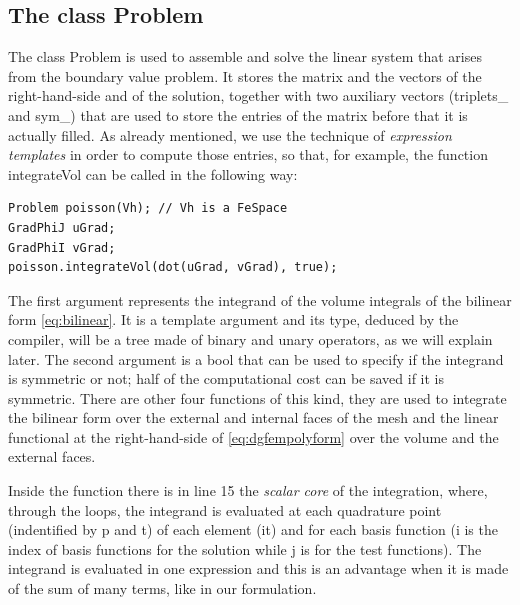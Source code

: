 \documentclass[12pt, a4paper]{article}
\newcommand{\code}[1]{{\footnotesize\ttfamily #1}}
\theoremstyle{definition}
\theoremstyle{plain}
\theoremstyle{plain}
\theoremstyle{definition}
\begin{document}
\subsection{The class Problem}

The class \code{Problem} is used to assemble and solve the linear system that arises from the boundary value problem.
It stores the matrix and the vectors of the right-hand-side and of the 
solution, together with two auxiliary vectors (\code{triplets\_} and 
\code{sym\_}) that are used to store the entries of the matrix before that it 
is actually filled.
As already mentioned, we use the technique of \emph{expression templates} in order to compute those entries, so that, for example, the function \code{integrateVol} can be called in the following way:
\begin{lstlisting}
Problem poisson(Vh); // Vh is a FeSpace
GradPhiJ uGrad;
GradPhiI vGrad;
poisson.integrateVol(dot(uGrad, vGrad), true);
\end{lstlisting}
The first argument represents the integrand of the volume integrals of the 
bilinear form \eqref{eq:bilinear}. It is a template argument and its type, 
deduced by the compiler, will be a tree made of binary and unary operators, as 
we will explain later.
The second argument is a \code{bool} that can be used to specify if the integrand is symmetric or not; half of the computational cost can be saved if it is symmetric. There are other four functions of this kind, they are used to integrate the bilinear form over the external and internal faces of the mesh and the linear functional at the right-hand-side of \eqref{eq:dgfempolyform} over the volume and the external faces.

Inside the function there is in line 15 the \emph{scalar core} of the integration, where, through the loops, the integrand is evaluated at each quadrature point (indentified by \code{p} and \code{t}) of each element (\code{*it}) and for each basis function (\code{i} is the index of basis functions for the solution while \code{j} is for the test functions). The integrand is evaluated in one expression and this is an advantage when it is made of the sum of many terms, like in our formulation.\\
\end{document}
